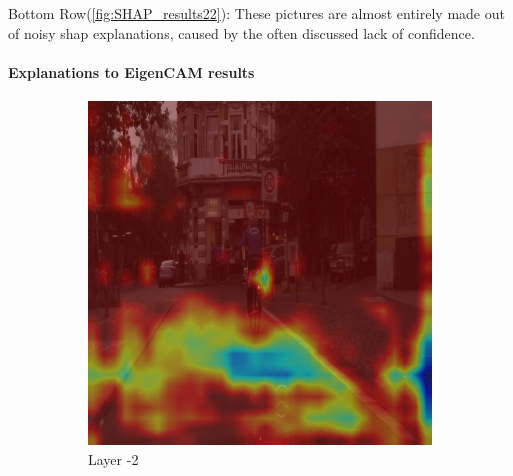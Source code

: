 Bottom Row(\ref{fig:SHAP_results22}): These pictures are almost entirely made out of noisy shap explanations, caused by the often discussed lack of confidence.

\paragraph{Explanations to EigenCAM results}
\begin{figure}[h!]
    \centering


    \begin{subfigure}[b]{0.49\textwidth}
        \centering
        \includegraphics[width=\textwidth]{figures/bonn_000036_000019_leftImg8bit.pnglayer-2/bonn_000036_000019_leftImg8bit.png_object(0)_heatmap}
        \caption{Layer -2}
        \label{fig:b-2}
    \end{subfigure}
    \hfill
    \begin{subfigure}[b]{0.49\textwidth}
        \centering

\end{subfigure}
\end{figure}
